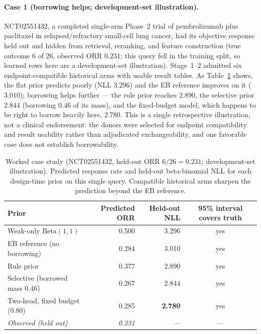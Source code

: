 \documentclass[11pt]{article}
\begin{document}
\paragraph{Case 1 (borrowing helps; development-set illustration).}
NCT02551432, a completed single-arm Phase~2
trial of pembrolizumab plus paclitaxel in relapsed/refractory small-cell lung
cancer, had its objective response held out and hidden from retrieval,
reranking, and feature construction (true outcome 6 of 26, observed ORR
$0.231$; this query fell in the training split, so learned rows here are a
development-set illustration). Stage~1--2 admitted six endpoint-compatible
historical arms with usable result tables. As Table~\ref{tab:case}
shows, the flat prior predicts poorly (NLL $3.296$) and the EB reference
improves on it ($3.010$); borrowing helps further --- the rule prior reaches
$2.890$, the selective prior $2.844$ (borrowing $0.46$ of its mass), and the
fixed-budget model, which happens to be right to borrow heavily here, $2.780$.
This is a single retrospective
illustration, not a clinical endorsement: the donors were selected for endpoint
compatibility and result usability rather than adjudicated exchangeability, and
one favorable case does not establish borrowability.

\begin{table}[htbp]
\centering
\caption{Worked case study (NCT02551432, held-out ORR $6/26 = 0.231$;
development-set illustration). Predicted
response rate and held-out beta-binomial NLL for each design-time prior on
this single query. Compatible historical arms sharpen the prediction beyond
the EB reference.}
\label{tab:case}
\begin{tabular}{lrrc}
\toprule
Prior & Predicted ORR & Held-out NLL & 95\% interval covers truth \\
\midrule
Weak-only $\mathrm{Beta}(1,1)$ & 0.500 & 3.296 & yes \\
EB reference (no borrowing) & 0.284 & 3.010 & yes \\
Rule prior & 0.377 & 2.890 & yes \\
Selective (borrowed mass $0.46$) & 0.267 & 2.844 & yes \\
Two-head, fixed budget ($0.80$) & 0.285 & \textbf{2.780} & yes \\
\textit{Observed (held out)} & \textit{0.231} & --- & --- \\
\bottomrule
\end{tabular}
\end{table}
\end{document}

